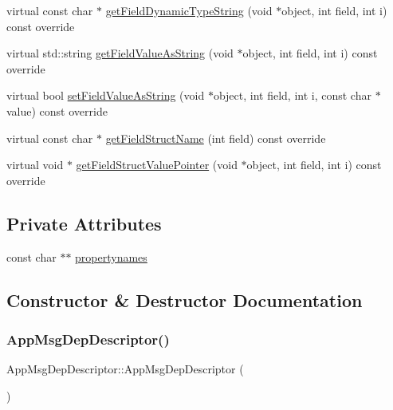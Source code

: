 \begin{DoxyCompactItemize}
\item 
virtual const char $\ast$ \hyperlink{classAppMsgDepDescriptor_a4badf7f0895de3039f46149053f19514}{get\+Field\+Dynamic\+Type\+String} (void $\ast$object, int field, int i) const override
\item 
virtual std\+::string \hyperlink{classAppMsgDepDescriptor_a83fabb429ce26b55eed23aebe202570d}{get\+Field\+Value\+As\+String} (void $\ast$object, int field, int i) const override
\item 
virtual bool \hyperlink{classAppMsgDepDescriptor_a47b4aaa772796c7ce821ea2ddff18ad1}{set\+Field\+Value\+As\+String} (void $\ast$object, int field, int i, const char $\ast$value) const override
\item 
virtual const char $\ast$ \hyperlink{classAppMsgDepDescriptor_af2db18f3d30d0d62bbb5238777f8c478}{get\+Field\+Struct\+Name} (int field) const override
\item 
virtual void $\ast$ \hyperlink{classAppMsgDepDescriptor_ae62715809f588f4f601bf524a6733be0}{get\+Field\+Struct\+Value\+Pointer} (void $\ast$object, int field, int i) const override
\end{DoxyCompactItemize}
\subsection*{Private Attributes}
\begin{DoxyCompactItemize}
\item 
const char $\ast$$\ast$ \hyperlink{classAppMsgDepDescriptor_a03578bf1418ef896a9abfcded857b728}{propertynames}
\end{DoxyCompactItemize}


\subsection{Constructor \& Destructor Documentation}
\mbox{\label{classAppMsgDepDescriptor_a9e34bc0dc8c5ebf87d3861c741a1ee78}} 
\subsubsection{\texorpdfstring{App\+Msg\+Dep\+Descriptor()}{AppMsgDepDescriptor()}}
{\footnotesize\ttfamily App\+Msg\+Dep\+Descriptor\+::\+App\+Msg\+Dep\+Descriptor (\begin{DoxyParamCaption}{ }\end{DoxyParamCaption})}

